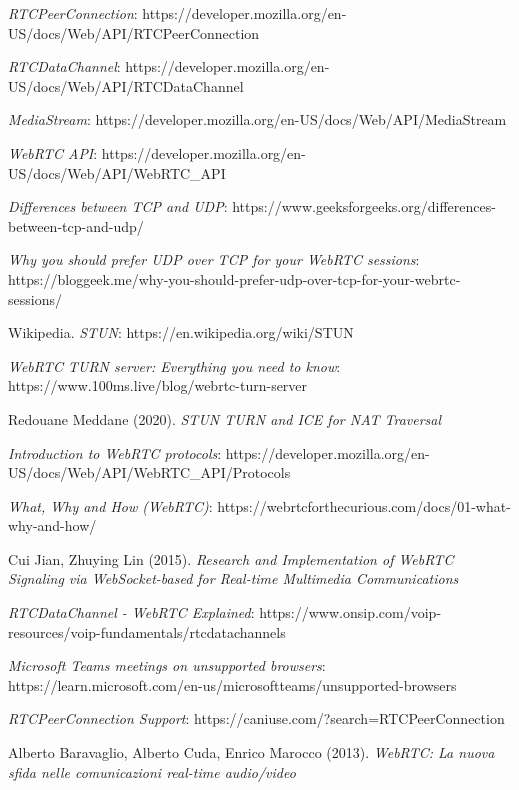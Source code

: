 \documentclass[11pt, a4paper, openany]{book}
\begin{document}
\begin{thebibliography}{9}
 		\emph{RTCPeerConnection}: https://developer.mozilla.org/en-US/docs/Web/API/RTCPeerConnection
 		
 		\emph{RTCDataChannel}: https://developer.mozilla.org/en-US/docs/Web/API/RTCDataChannel
 		
 		\emph{MediaStream}: https://developer.mozilla.org/en-US/docs/Web/API/MediaStream
 		
 		\emph{WebRTC API}: https://developer.mozilla.org/en-US/docs/Web/API/WebRTC\_API
 		
 		\emph{Differences between TCP and UDP}: https://www.geeksforgeeks.org/differences-between-tcp-and-udp/
 		
 		\emph{Why you should prefer UDP over TCP for your WebRTC sessions}: https://bloggeek.me/why-you-should-prefer-udp-over-tcp-for-your-webrtc-sessions/
 		
 		Wikipedia. \emph{STUN}: https://en.wikipedia.org/wiki/STUN
 		
 		\emph{WebRTC TURN server: Everything you need to know}: https://www.100ms.live/blog/webrtc-turn-server
 		
 		Redouane Meddane (2020). \emph{STUN TURN and ICE for NAT Traversal}
 		
 		\emph{Introduction to WebRTC protocols}: https://developer.mozilla.org/en-US/docs/Web/API/WebRTC\_API/Protocols
 		
 		\emph{What, Why and How (WebRTC)}: https://webrtcforthecurious.com/docs/01-what-why-and-how/
 		
 		Cui Jian, Zhuying Lin (2015). \emph{Research and Implementation of WebRTC Signaling via WebSocket-based for Real-time Multimedia Communications}
 		
 		\emph{RTCDataChannel - WebRTC Explained}: https://www.onsip.com/voip-resources/voip-fundamentals/rtcdatachannels
 		
 		\emph{Microsoft Teams meetings on unsupported browsers}: https://learn.microsoft.com/en-us/microsoftteams/unsupported-browsers
 		
 		\emph{RTCPeerConnection Support}: https://caniuse.com/?search=RTCPeerConnection
 		
 		Alberto Baravaglio, Alberto Cuda, Enrico Marocco (2013). \emph{WebRTC: La nuova sfida nelle comunicazioni real-time audio/video}
 		

\end{thebibliography}
\end{document}
